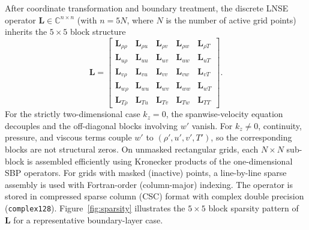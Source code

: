 \documentclass[11pt]{article}
\newcommand{\bL}{\mathbf{L}}
\begin{document}
After coordinate transformation and boundary treatment, the discrete LNSE operator $\bL \in \mathbb{C}^{n\times n}$ (with $n = 5N$, where $N$ is the number of active grid points) inherits the $5\times5$ block structure
\begin{equation}
  \bL =
  \begin{bmatrix}
    \bL_{\rho\rho} & \bL_{\rho u} & \bL_{\rho v} & \bL_{\rho w} & \bL_{\rho T}\\
    \bL_{u\rho} & \bL_{uu} & \bL_{uv} & \bL_{uw} & \bL_{uT}\\
    \bL_{v\rho} & \bL_{vu} & \bL_{vv} & \bL_{vw} & \bL_{vT}\\
    \bL_{w\rho} & \bL_{wu} & \bL_{wv} & \bL_{ww} & \bL_{wT}\\
    \bL_{T\rho} & \bL_{Tu} & \bL_{Tv} & \bL_{Tw} & \bL_{TT}
  \end{bmatrix}.
  \label{eq:block_L}
\end{equation}
For the strictly two-dimensional case $k_z=0$, the spanwise-velocity equation decouples and the off-diagonal blocks involving $w'$ vanish. For $k_z\neq0$, continuity, pressure, and viscous terms couple $w'$ to $(\rho',u',v',T')$, so the corresponding blocks are not structural zeros.
On unmasked rectangular grids, each $N\times N$ sub-block is assembled efficiently using Kronecker products of the one-dimensional SBP operators.
For grids with masked (inactive) points, a line-by-line sparse assembly is used with Fortran-order (column-major) indexing.
The operator is stored in compressed sparse column (CSC) format with complex double precision (\texttt{complex128}).
Figure~\ref{fig:sparsity} illustrates the $5\times5$ block sparsity pattern of $\bL$ for a representative boundary-layer case.
\end{document}
